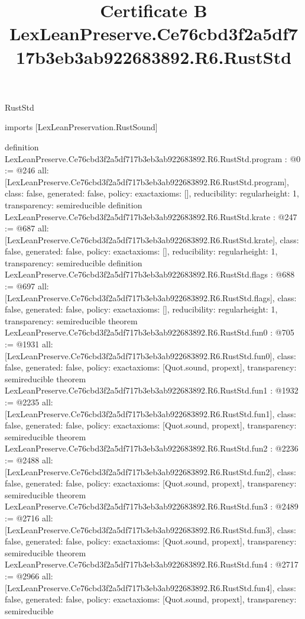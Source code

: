 \begin{lexlean}{RustStd}
\title{Certificate B LexLeanPreserve.Ce76cbd3f2a5df717b3eb3ab922683892.R6.RustStd}
\begin{coremodule}
imports [LexLeanPreservation.RustSound]

definition LexLeanPreserve.Ce76cbd3f2a5df717b3eb3ab922683892.R6.RustStd.program : @0 := @246 {
  all: [LexLeanPreserve.Ce76cbd3f2a5df717b3eb3ab922683892.R6.RustStd.program],
  class: false,
  generated: false,
  policy: exact{axioms: []},
  reducibility: regular{height: 1},
  transparency: semireducible
}
definition LexLeanPreserve.Ce76cbd3f2a5df717b3eb3ab922683892.R6.RustStd.krate : @247 := @687 {
  all: [LexLeanPreserve.Ce76cbd3f2a5df717b3eb3ab922683892.R6.RustStd.krate],
  class: false,
  generated: false,
  policy: exact{axioms: []},
  reducibility: regular{height: 1},
  transparency: semireducible
}
definition LexLeanPreserve.Ce76cbd3f2a5df717b3eb3ab922683892.R6.RustStd.flags : @688 := @697 {
  all: [LexLeanPreserve.Ce76cbd3f2a5df717b3eb3ab922683892.R6.RustStd.flags],
  class: false,
  generated: false,
  policy: exact{axioms: []},
  reducibility: regular{height: 1},
  transparency: semireducible
}
theorem LexLeanPreserve.Ce76cbd3f2a5df717b3eb3ab922683892.R6.RustStd.fun0 : @705 := @1931 {
  all: [LexLeanPreserve.Ce76cbd3f2a5df717b3eb3ab922683892.R6.RustStd.fun0],
  class: false,
  generated: false,
  policy: exact{axioms: [Quot.sound, propext]},
  transparency: semireducible
}
theorem LexLeanPreserve.Ce76cbd3f2a5df717b3eb3ab922683892.R6.RustStd.fun1 : @1932 := @2235 {
  all: [LexLeanPreserve.Ce76cbd3f2a5df717b3eb3ab922683892.R6.RustStd.fun1],
  class: false,
  generated: false,
  policy: exact{axioms: [Quot.sound, propext]},
  transparency: semireducible
}
theorem LexLeanPreserve.Ce76cbd3f2a5df717b3eb3ab922683892.R6.RustStd.fun2 : @2236 := @2488 {
  all: [LexLeanPreserve.Ce76cbd3f2a5df717b3eb3ab922683892.R6.RustStd.fun2],
  class: false,
  generated: false,
  policy: exact{axioms: [Quot.sound, propext]},
  transparency: semireducible
}
theorem LexLeanPreserve.Ce76cbd3f2a5df717b3eb3ab922683892.R6.RustStd.fun3 : @2489 := @2716 {
  all: [LexLeanPreserve.Ce76cbd3f2a5df717b3eb3ab922683892.R6.RustStd.fun3],
  class: false,
  generated: false,
  policy: exact{axioms: [Quot.sound, propext]},
  transparency: semireducible
}
theorem LexLeanPreserve.Ce76cbd3f2a5df717b3eb3ab922683892.R6.RustStd.fun4 : @2717 := @2966 {
  all: [LexLeanPreserve.Ce76cbd3f2a5df717b3eb3ab922683892.R6.RustStd.fun4],
  class: false,
  generated: false,
  policy: exact{axioms: [Quot.sound, propext]},
  transparency: semireducible
}
\end{coremodule}
\end{lexlean}
